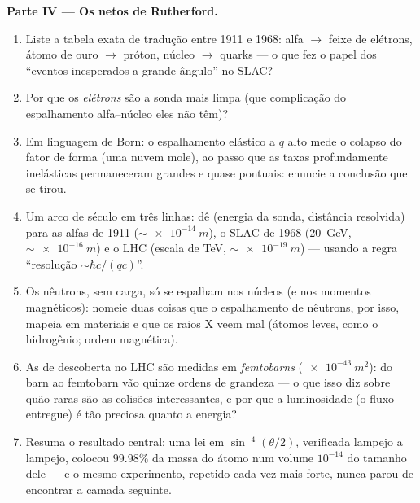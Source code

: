 \begin{problem}
\medskip\noindent\textbf{Parte IV --- Os netos de Rutherford.}
\begin{enumerate}[resume]
  \item Liste a tabela exata de tradução entre 1911 e 1968: alfa $\to$
        feixe de elétrons, átomo de ouro $\to$ próton, núcleo $\to$
        quarks --- o que fez o papel dos ``eventos inesperados a grande
        ângulo'' no SLAC?
  \item Por que os \emph{elétrons} são a sonda mais limpa (que
        complicação do espalhamento alfa--núcleo eles não têm)?
  \item Em linguagem de Born: o espalhamento elástico a $q$ alto mede o
        colapso do fator de forma (uma nuvem mole), ao passo que as
        taxas profundamente inelásticas permaneceram grandes e quase
        pontuais: enuncie a conclusão que se tirou.
  \item Um arco de século em três linhas: dê (energia da sonda,
        distância resolvida) para as alfas de 1911 ($\sim\qty{e-14}{m}$),
        o SLAC de 1968 (\qty{20}{GeV}, $\sim\qty{e-16}{m}$) e o
        LHC (escala de TeV, $\sim\qty{e-19}{m}$) --- usando a regra
        ``resolução $\sim \hbar c/(qc)$''.
  \item Os nêutrons, sem carga, só se espalham nos núcleos (e nos
        momentos magnéticos): nomeie duas coisas que o espalhamento de
        nêutrons, por isso, mapeia em materiais e que os raios X veem
        mal (átomos leves, como o hidrogênio; ordem magnética).
  \item As  de descoberta no LHC são medidas em
        \emph{femtobarns} ($\qty{e-43}{m^2}$): do barn ao femtobarn vão
        quinze ordens de grandeza --- o que isso diz sobre quão raras
        são as colisões interessantes, e por que a luminosidade (o
        fluxo entregue) é tão preciosa quanto a energia?
  \item Resuma o resultado central: uma lei em $\sin^{-4}(\theta/2)$,
        verificada lampejo a lampejo, colocou $99.98\%$ da massa do
        átomo num volume $10^{-14}$ do tamanho dele --- e o mesmo
        experimento, repetido cada vez mais forte, nunca parou de
        encontrar a camada seguinte.
\end{enumerate}
\end{problem}
